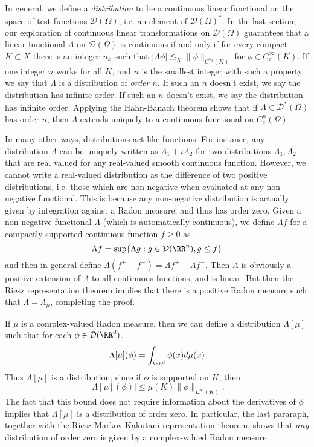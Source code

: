 In general, we define a \emph{distribution} to be a continuous linear functional on the space of test functions $\mathcal{D}(\Omega)$, i.e. an element of $\mathcal{D}(\Omega)^*$. In the last section, our exploration of continuous linear transformations on $\mathcal{D}(\Omega)$ guarantees that a linear functional $\Lambda$ on $\mathcal{D}(\Omega)$ is continuous if and only if for every compact $K \subset X$ there is an integer $n_k$ such that $|\Lambda \phi| \lesssim_K \| \phi \|_{C^{n_k}(K)}$ for $\phi \in C_c^\infty(K)$. If one integer $n$ works for all $K$, and $n$ is the smallest integer with such a property, we say that $\Lambda$ is a distribution of \emph{order $n$}. If such an $n$ doesn't exist, we say the distribution has infinite order. If such an $n$ doesn't exist, we say the distribution has infinite order. Applying the Hahn-Banach theorem shows that if $\Lambda \in \mathcal{D}^*(\Omega)$ has order $n$, then $\Lambda$ extends uniquely to a continuous functional on $C^n_c(\Omega)$.

In many other ways, distributions act like functions. For instance, any distribution $\Lambda$ can be uniquely written as $\Lambda_1 + i \Lambda_2$ for two distributions $\Lambda_1, \Lambda_2$ that are real valued for any real-valued smooth continuous function. However, we cannot write a real-valued distribution as the difference of two positive distributions, i.e. those which are non-negative when evaluated at any non-negative functional. This is because any non-negative distribution is actually given by integration against a Radon measure, and thus has order zero. Given a non-negative functional $\Lambda$ (which is automatically continuous),  we define $\Lambda f$ for a compactly supported continuous function $f \geq 0$ as
%
\[ \Lambda f = \sup \{ \Lambda g: g \in \mathcal{D}(\RR^n), g \leq f \} \]
%
and then in general define $\Lambda (f^+ - f^-) = \Lambda f^+ - \Lambda f^-$. Then $\Lambda$ is obviously a positive extension of $\Lambda$ to all continuous functions, and is linear. But then the Riesz representation theorem implies that there is a positive Radon measure such that $\Lambda = \Lambda_\mu$, completing the proof.

\begin{example}
    If $\mu$ is a complex-valued Radon measure, then we can define a distribution $\Lambda[\mu]$ such that for each $\phi \in \mathcal{D}(\RR^d)$.
    \[ \Lambda[\mu](\phi) = \int_{\RR^d} \phi(x) d\mu(x) \]
    Thus $\Lambda[\mu]$ is a distribution, since if $\phi$ is supported on $K$, then
    \[ |\Lambda[\mu](\phi)| \leq \mu(K) \| \phi \|_{L^\infty(K)}. \]
    The fact that this bound does not require information about the derivatives of $\phi$ implies that $\Lambda[\mu]$ is a distribution of order zero. In particular, the last pararaph, together with the Riesz-Markov-Kakutani representation theorem, shows that \emph{any} distribution of order zero is given by a complex-valued Radon measure.
\end{example}


